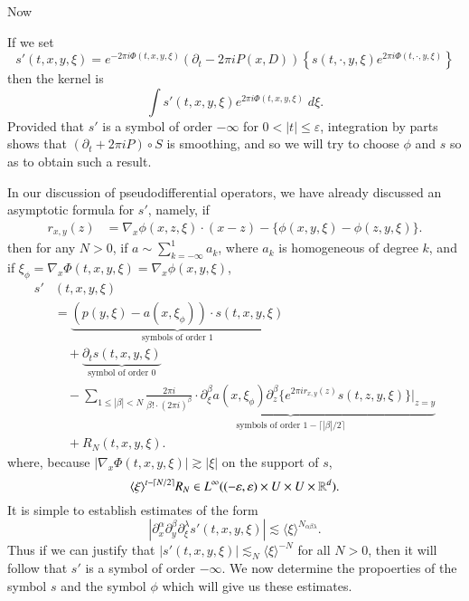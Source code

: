 Now

%
If we set
%
\[ s'(t,x,y,\xi) = e^{- 2 \pi i \Phi(t,x,y,\xi)} (\partial_t - 2 \pi i P(x,D)) \left\{ s(t,\cdot,y,\xi) e^{2 \pi i \Phi(t,\cdot,y,\xi)} \right\} \]
%
then the kernel is
%
\[ \int s'(t,x,y,\xi) e^{2 \pi i \Phi(t,x,y,\xi)}\; d\xi. \]
%
Provided that $s'$ is a symbol of order $-\infty$ for $0 < |t| \leq \varepsilon$, integration by parts shows that $(\partial_t + 2 \pi i P) \circ S$ is smoothing, and so we will try to choose $\phi$ and $s$ so as to obtain such a result.

In our discussion of pseudodifferential operators, we have already discussed an asymptotic formula for $s'$, namely, if
%
\begin{align*}
    r_{x,y}(z) &= \nabla_x \phi(x,z,\xi) \cdot (x - z) - \{ \phi(x,y,\xi) - \phi(z,y,\xi) \}.
\end{align*}
%
then for any $N > 0$, if $a \sim \sum_{k = -\infty}^1 a_k$, where $a_k$ is homogeneous of degree $k$, and if $\xi_\phi = \nabla_x \Phi(t,x,y,\xi) = \nabla_x \phi(x,y,\xi)$,
\begin{align*}
    s' & (t,x,y,\xi)\\
    &= \underbrace{ \left( p(y,\xi) - a(x, \xi_\phi) \right) \cdot s(t,x,y,\xi) }_{\text{symbols of order 1}}\\
    &\quad + \underbrace{\partial_t s(t,x,y,\xi)}_{\text{symbol of order $0$}}  \\
    &\quad - \sum_{1 \leq |\beta| < N} \underbrace{\frac{2 \pi i}{\beta! \cdot (2 \pi i)^\beta} \cdot \partial_\xi^\beta a(x, \xi_\phi) \partial_z^\beta \{ e^{2 \pi i r_{x,y}(z)} s(t,z,y,\xi) \} |_{z = y}}_{\text{symbols of order $1 - \lceil |\beta| / 2 \rceil$}}\\
    &\quad + R_N(t,x,y,\xi).
\end{align*}
%
where, because $|\nabla_x \Phi(t,x,y,\xi)| \gtrsim |\xi|$ on the support of $s$,
%
\[ \langle \xi \rangle^{t - \lceil N/2 \rceil} R_N \in L^\infty((-\varepsilon,\varepsilon) \times U \times U \times \operatorname{\mathbb{R}}^d). \]
%
It is simple to  establish estimates of the form
%
\[ |\partial_x^\alpha \partial_y^\beta \partial_\xi^\lambda s'(t,x,y,\xi)| \lesssim \langle \xi \rangle^{N_{\alpha \beta \lambda}}. \]
%
Thus if we can justify that $|s'(t,x,y,\xi)| \lesssim_N \langle \xi \rangle^{-N}$ for all $N > 0$, then it will follow that $s'$ is a symbol of order $-\infty$. We now determine the propoerties of the symbol $s$ and the symbol $\phi$ which will give us these estimates.

